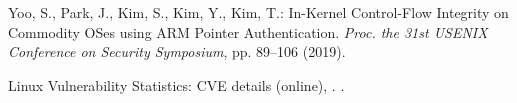 \documentclass[english,preprint,JIP]{ipsj}
\begin{document}
\begin{thebibliography}{99}
  Yoo, S., Park, J., Kim, S., Kim, Y., Kim, T.: In-Kernel Control-Flow Integrity on Commodity OSes using ARM Pointer Authentication.
  \textit{Proc. the 31st USENIX Conference on Security Symposium}, pp. 89--106 (2019). 

  Linux Vulnerability Statistics: CVE details (online), . .

  
\end{thebibliography}



\end{document}
